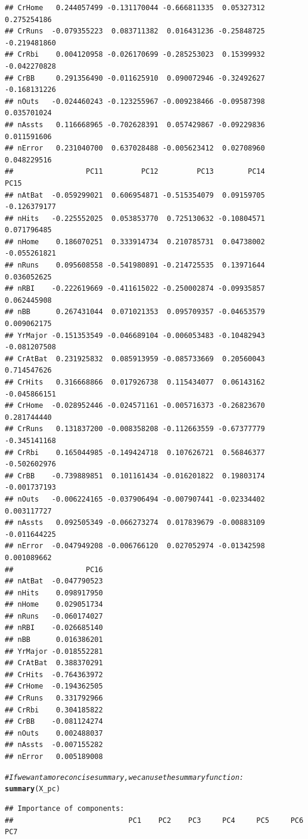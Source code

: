 \documentclass{article}\usepackage[]{graphicx}\usepackage[]{color}
\makeatletter
\newcommand{\hlcom}[1]{\textcolor[rgb]{0.678,0.584,0.686}{\textit{#1}}}%
\newcommand{\hlstd}[1]{\textcolor[rgb]{0.345,0.345,0.345}{#1}}%
\newcommand{\hlkwd}[1]{\textcolor[rgb]{0.737,0.353,0.396}{\textbf{#1}}}%
\newenvironment{kframe}{%
 \def\at@end@of@kframe{}%
 \ifinner\ifhmode%
  \def\at@end@of@kframe{\end{minipage}}%
  \begin{minipage}{\columnwidth}%
 \fi\fi%
 \def\FrameCommand##1{\hskip\@totalleftmargin \hskip-\fboxsep
 \colorbox{shadecolor}{##1}\hskip-\fboxsep
     \hskip-\linewidth \hskip-\@totalleftmargin \hskip\columnwidth}%
 \MakeFramed {\advance\hsize-\width
   \@totalleftmargin\z@ \linewidth\hsize
   \@setminipage}}%
 {\par\unskip\endMakeFramed%
 \at@end@of@kframe}
\newenvironment{knitrout}{}{} %
\makeatother
\begin{document}
\begin{knitrout}
\begin{kframe}
\begin{verbatim}
## CrHome   0.244057499 -0.131170044 -0.666811335  0.05327312  0.275254186
## CrRuns  -0.079355223  0.083711382  0.016431236 -0.25848725 -0.219481860
## CrRbi    0.004120958 -0.026170699 -0.285253023  0.15399932 -0.042270828
## CrBB     0.291356490 -0.011625910  0.090072946 -0.32492627 -0.168131226
## nOuts   -0.024460243 -0.123255967 -0.009238466 -0.09587398  0.035701024
## nAssts   0.116668965 -0.702628391  0.057429867 -0.09229836  0.011591606
## nError   0.231040700  0.637028488 -0.005623412  0.02708960  0.048229516
##                 PC11         PC12         PC13        PC14         PC15
## nAtBat  -0.059299021  0.606954871 -0.515354079  0.09159705 -0.126379177
## nHits   -0.225552025  0.053853770  0.725130632 -0.10804571  0.071796485
## nHome    0.186070251  0.333914734  0.210785731  0.04738002 -0.055261821
## nRuns    0.095608558 -0.541980891 -0.214725535  0.13971644  0.036052625
## nRBI    -0.222619669 -0.411615022 -0.250002874 -0.09935857  0.062445908
## nBB      0.267431044  0.071021353  0.095709357 -0.04653579  0.009062175
## YrMajor -0.151353549 -0.046689104 -0.006053483 -0.10482943 -0.081207508
## CrAtBat  0.231925832  0.085913959 -0.085733669  0.20560043  0.714547626
## CrHits   0.316668866  0.017926738  0.115434077  0.06143162 -0.045866151
## CrHome  -0.028952446 -0.024571161 -0.005716373 -0.26823670  0.281744440
## CrRuns   0.131837200 -0.008358208 -0.112663559 -0.67377779 -0.345141168
## CrRbi    0.165044985 -0.149424718  0.107626721  0.56846377 -0.502602976
## CrBB    -0.739889851  0.101161434 -0.016201822  0.19803174 -0.001737193
## nOuts   -0.006224165 -0.037906494 -0.007907441 -0.02334402  0.003117727
## nAssts   0.092505349 -0.066273274  0.017839679 -0.00883109 -0.011644225
## nError  -0.047949208 -0.006766120  0.027052974 -0.01342598  0.001089662
##                 PC16
## nAtBat  -0.047790523
## nHits    0.098917950
## nHome    0.029051734
## nRuns   -0.060174027
## nRBI    -0.026685140
## nBB      0.016386201
## YrMajor -0.018552281
## CrAtBat  0.388370291
## CrHits  -0.764363972
## CrHome  -0.194362505
## CrRuns   0.331792966
## CrRbi    0.304185822
## CrBB    -0.081124274
## nOuts    0.002488037
## nAssts  -0.007155282
## nError   0.005189008
\end{verbatim}
\begin{alltt}
\hlcom{# If we want a more concise summary, we can use the summary function:}
\hlkwd{summary}\hlstd{(X_pc)}
\end{alltt}
\begin{verbatim}
## Importance of components:
##                           PC1    PC2    PC3     PC4     PC5     PC6     PC7

\end{verbatim}
\end{kframe}
\end{knitrout}
\end{document}
